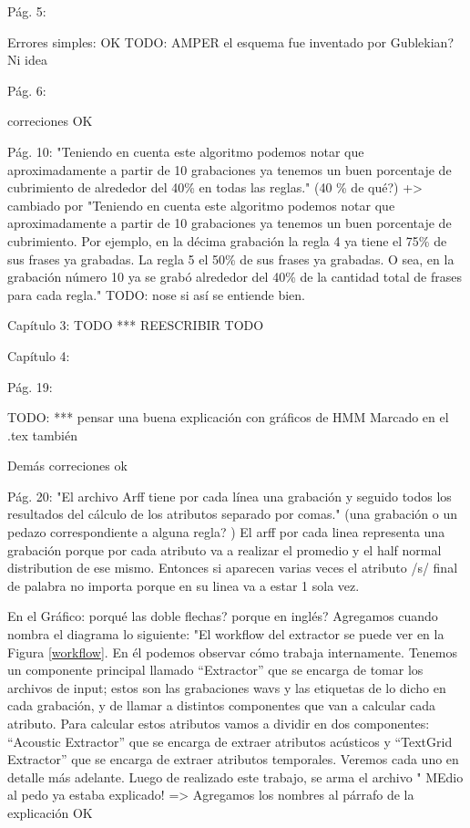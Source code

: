 Pág. 5:

Errores simples: OK
TODO: AMPER el esquema fue inventado por Gublekian? Ni idea

Pág. 6: 

correciones OK

Pág. 10:
"Teniendo en cuenta este algoritmo podemos notar que aproximadamente a partir de 10 grabaciones ya tenemos un buen porcentaje de cubrimiento de alrededor del 40\% en todas las reglas." (40 \% de qué?) +> cambiado por
"Teniendo en cuenta este algoritmo podemos notar que aproximadamente a partir de 10 grabaciones ya tenemos un buen porcentaje de cubrimiento. Por ejemplo, en la décima grabación la regla 4 ya tiene el 75\% de sus frases ya grabadas. La regla 5 el 50\% de sus frases ya grabadas. O sea, en la grabación número 10 ya se grabó alrededor del 40\% de la cantidad total de frases para cada regla." TODO: nose si así se entiende bien.

Capítulo 3: TODO *** REESCRIBIR TODO

Capítulo 4:

Pág. 19: 

TODO: *** pensar una buena explicación con gráficos de HMM 
Marcado en el .tex también

Demás correciones ok

Pág. 20: 
"El archivo Arff tiene por cada línea una grabación y seguido todos los resultados del cálculo de los atributos separado por comas." (una grabación o un pedazo correspondiente a alguna regla? )
El arff por cada linea representa una grabación porque por cada atributo va a realizar el promedio y el half normal distribution de ese mismo. Entonces si aparecen varias veces el atributo /s/ final de palabra no importa porque en su linea va a estar 1 sola vez.

En el Gráfico: porqué las doble flechas? porque en inglés?
Agregamos cuando nombra el diagrama lo siguiente:
"El workflow del extractor se puede ver en la Figura \ref{workflow}. En él podemos observar cómo trabaja internamente. Tenemos un componente principal llamado ``Extractor'' que se encarga de tomar los archivos de input; estos son las grabaciones wavs y las etiquetas de lo dicho en cada grabación, y de llamar a distintos componentes que van a calcular cada atributo. Para calcular estos atributos vamos a dividir en dos componentes: ``Acoustic Extractor'' que se encarga de extraer atributos acústicos y ``TextGrid Extractor'' que se encarga de extraer atributos temporales. Veremos cada uno en detalle más adelante. Luego de realizado este trabajo, se arma el archivo  " MEdio al pedo ya estaba explicado!
=> Agregamos los nombres al párrafo de la explicación OK

